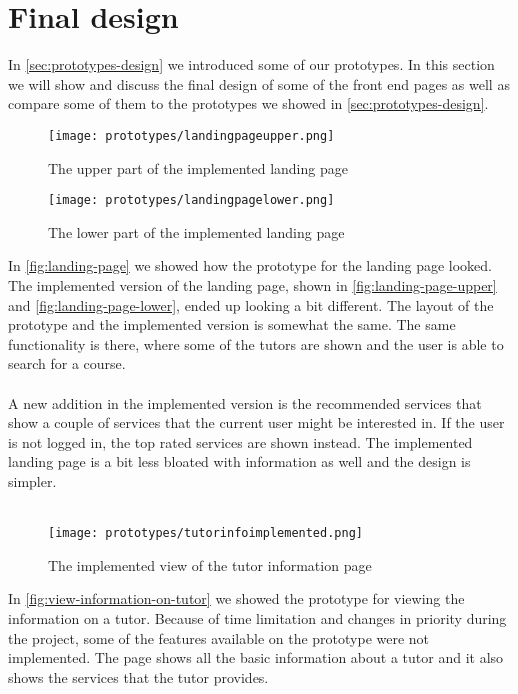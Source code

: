 \section{Final design}
In \autoref{sec:prototypes-design} we introduced some of our prototypes.
In this section we will show and discuss the final design of some of the front end pages as well as compare some of them to the prototypes we showed in \autoref{sec:prototypes-design}.
\begin{figure}
    \centering
    \texttt{[image: prototypes/landingpageupper.png]} 
    \caption{The upper part of the implemented landing page}
    \label{fig:landing-page-upper}
\end{figure}
\begin{figure}
    \centering
    \texttt{[image: prototypes/landingpagelower.png]} 
    \caption{The lower part of the implemented landing page}
    \label{fig:landing-page-lower}
\end{figure}
\noindent
In \autoref{fig:landing-page} we showed how the prototype for the landing page looked.
The implemented version of the landing page, shown in \autoref{fig:landing-page-upper} and \autoref{fig:landing-page-lower}, ended up looking a bit different.
The layout of the prototype and the implemented version is somewhat the same. 
The same functionality is there, where some of the tutors are shown and the user is able to search for a course. 
\\\\
A new addition in the implemented version is the recommended services that show a couple of services that the current user might be interested in. 
If the user is not logged in, the top rated services are shown instead. 
The implemented landing page is a bit less bloated with information as well and the design is simpler.
\\\\
\begin{figure}
    \centering
    \texttt{[image: prototypes/tutorinfoimplemented.png]} 
    \caption{The implemented view of the tutor information page}
    \label{fig:tutor-info-implemented}
\end{figure}
\noindent
In \autoref{fig:view-information-on-tutor} we showed the prototype for viewing the information on a tutor.
Because of time limitation and changes in priority during the project, some of the features available on the prototype were not implemented.
The page shows all the basic information about a tutor and it also shows the services that the tutor provides.
